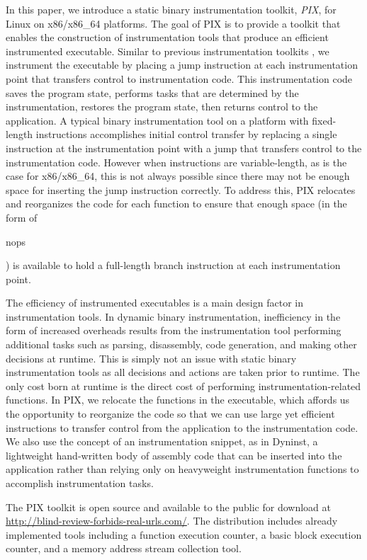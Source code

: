 In this paper, we introduce a static binary instrumentation toolkit, \textit{PIX}, for Linux on
x86/x86\_64 platforms. The goal of PIX is to provide a toolkit that enables the construction of
instrumentation tools that produce an efficient instrumented
executable. Similar to previous instrumentation toolkits \cite{buck2000api}, we instrument the executable 
by placing a jump instruction at each instrumentation
point that transfers control to instrumentation code. This instrumentation code saves the
program state, performs tasks that are determined by the instrumentation,
restores the program state, then returns control to the application.
A typical binary instrumentation tool on a platform with fixed-length instructions 
\cite{tikir2006pmac} accomplishes initial control transfer by replacing a
single instruction at the instrumentation point with a jump that transfers
control to the instrumentation code. However when instructions are variable-length, as
is the case for x86/x86\_64, this is not always possible since there may not be enough space for 
inserting the jump instruction correctly. To address this, PIX
relocates and reorganizes the code for each function to ensure that enough
space (in the form of \begin{it}nops\end{it}) is available to hold a full-length branch instruction at each
instrumentation point.

The efficiency of instrumented executables is a main design factor in instrumentation tools. In dynamic binary instrumentation,
inefficiency in the form of increased overheads results from the instrumentation tool performing additional tasks such 
as parsing, disassembly, code generation, and making other decisions at runtime. This
is simply not an issue with static binary instrumentation tools as all
decisions and actions are taken prior to runtime. The only cost born at runtime is the direct
cost of performing instrumentation-related functions. In PIX, we relocate the 
functions in the executable, which affords us the opportunity to reorganize the code so that we
can use large yet efficient instructions to transfer control from the
application to the instrumentation code. We also use the concept of an
instrumentation snippet, as in Dyninst, a lightweight hand-written body of assembly code that can
be inserted into the application rather than relying only on heavyweight
instrumentation functions to accomplish instrumentation tasks.

The PIX toolkit is open source and available to the public for download 
at \url{http://blind-review-forbids-real-urls.com/}. The distribution includes already implemented tools 
including a function execution counter, a basic block
execution counter, and a memory address stream collection tool.

